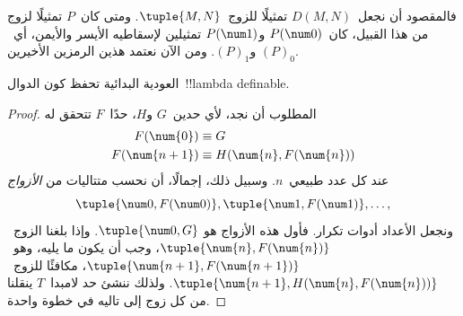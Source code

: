 \documentclass[../../../include/open-logic-section]{subfiles}
\begin{document}
فالمقصود أن نجعل~$D(M,N)$ تمثيلًا للزوج~$\tuple{M, N}$. ومتى كان~$P$
تمثيلًا لزوج من هذا القبيل، كان~$P(\num 0)$ و$P(\num 1)$ تمثيلين لإسقاطيه الأيسر والأيمن،
أي~$(P)_0$ و$(P)_1$. ومن الآن نعتمد هذين الرمزين الأخيرين.

\begin{lem}
العودية البدائية تحفظ كون الدوال~!!{lambda definable}.
\end{lem}

\begin{proof}
المطلوب أن نجد، لأي حدين~$G$ و$H$، حدًا~$F$ تتحقق له
\begin{align*}
F(\num{0}) & \equiv G \\
F(\num{n+1}) & \equiv H(\num{n}, F(\num{n}))
\end{align*}
عند كل عدد طبيعي~$n$. وسبيل ذلك، إجمالًا، أن نحسب متتاليات من
\emph{الأزواج}
\[
\tuple{\num 0, F(\num 0)}, \tuple{\num 1, F(\num 1)}, \dots,
\]
ونجعل الأعداد أدوات تكرار. فأول هذه الأزواج هو
$\tuple{\num 0, G}$. وإذا بلغنا الزوج~$\tuple{\num{n}, F(\num{n})}$، وجب أن يكون ما يليه، وهو~$\tuple{\num{n+1}, F(\num{n+1})}$،
مكافئًا للزوج~$\tuple{\num{n+1}, H(\num{n}, F(\num{n}))}$. ولذلك ننشئ حد لامبدا~$T$ ينقلنا من كل زوج إلى تاليه في خطوة واحدة.


\end{proof}
\end{document}
